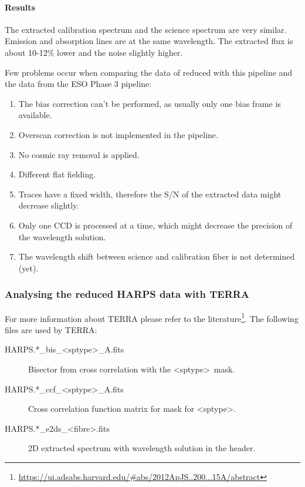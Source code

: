 \documentclass[10pt,a4paper]{article}
\begin{document}
\paragraph{Results}
The extracted calibration spectrum and the science spectrum are very similar. Emission and absorption lines are at the same wavelength. The extracted flux is about 10-12\% lower and the noise slightly higher.

Few problems occur when comparing the data of reduced with this pipeline and the data from the ESO Phase 3 pipeline:
\begin{enumerate}\setlength\itemsep{0em}
  \item The bias correction can't be performed, as usually only one bias frame is available.
  \item Overscan correction is not implemented in the pipeline.
  \item No cosmic ray removal is applied.
  \item Different flat fielding.
  \item Traces have a fixed width, therefore the S/N of the extracted data might decrease slightly.
  \item Only one CCD is processed at a time, which might decrease the precision of the wavelength solution.
  \item The wavelength shift between science and calibration fiber is not determined (yet).
\end{enumerate}

\subsubsection{Analysing the reduced HARPS data with TERRA}
For more information about TERRA please refer to the literature\footnote{\url{https://ui.adsabs.harvard.edu/\#abs/2012ApJS..200...15A/abstract}}. The following files are used by TERRA:
\begin{description}
  \item[HARPS.*\_bis\_\textless sptype\textgreater\_A.fits] Bisector from cross correlation with the \textless sptype\textgreater\ mask.
  \item[HARPS.*\_ccf\_\textless sptype\textgreater\_A.fits] Cross correlation function matrix for mask for \textless sptype\textgreater.
  \item[HARPS.*\_e2ds\_\textless fibre\textgreater.fits] 2D extracted spectrum with wavelength solution in the header.
\end{description}
\end{document}

